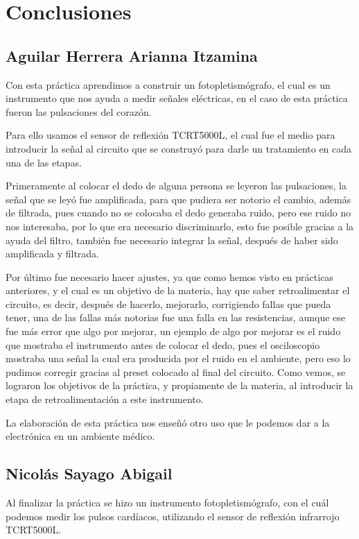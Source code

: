 \documentclass[12pt]{article}
\begin{document}
    \section{Conclusiones}
        \subsection{Aguilar Herrera Arianna Itzamina}
        Con esta práctica aprendimos a construir un fotopletismógrafo, el cual es un instrumento que nos ayuda a medir señales eléctricas, en el caso de esta práctica fueron las pulsaciones del corazón. 
        
        Para ello usamos el sensor de reflexión TCRT5000L, el cual fue el medio para introducir la señal al circuito que se construyó para darle un tratamiento en cada una de las etapas. 
        
        Primeramente al colocar el dedo de alguna persona se leyeron las pulsaciones, la señal que se leyó fue amplificada, para que pudiera ser notorio el cambio, además de filtrada, pues cuando no se colocaba el dedo generaba ruido, pero ese ruido no nos interesaba, por lo que era necesario discriminarlo, esto fue posible gracias a la ayuda del filtro, también fue necesario integrar la señal, después de haber sido amplificada y filtrada.
        
        Por último fue necesario hacer ajustes, ya que como hemos visto en prácticas anteriores, y el cual es un objetivo de la materia, hay que saber retroalimentar el circuito, es decir, después de hacerlo, mejorarlo, corrigiendo fallas que pueda tener, una de las fallas más notorias fue una falla en las resistencias, aunque ese fue más error que algo por mejorar, un ejemplo de algo por mejorar es el ruido que mostraba el instrumento antes de colocar el dedo, pues el osciloscopio mostraba una señal la cual era producida por el ruido en el ambiente, pero eso lo pudimos corregir gracias al preset colocado al final del circuito. 
        Como vemos, se lograron los objetivos de la práctica, y propiamente de la materia, al introducir la etapa de retroalimentación a este instrumento. 
        
        La elaboración de esta práctica nos enseñó otro uso que le podemos dar a la electrónica en un ambiente médico. 
        
      
        \subsection{Nicolás Sayago Abigail}
            Al finalizar la práctica se hizo un instrumento  fotopletismógrafo, con el cuál podemos medir los pulsos cardíacos, utilizando el sensor de reflexión infrarrojo TCRT5000L.
            
\end{document}
